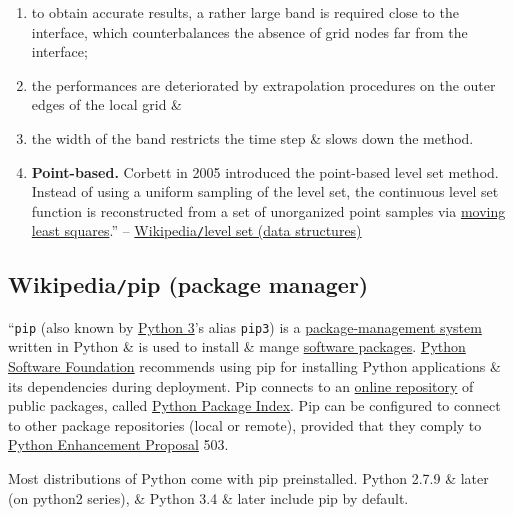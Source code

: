 \documentclass{article}
\begin{document}
\begin{enumerate}
\begin{enumerate}
		\item to obtain accurate results, a rather large band is required close to the interface, which counterbalances the absence of grid nodes far from the interface;
		\item the performances are deteriorated by extrapolation procedures on the outer edges of the local grid \&
		\item the width of the band restricts the time step \& slows down the method.
		\item {\bf Point-based.} {\sc Corbett} in 2005 introduced the point-based level set method. Instead of using a uniform sampling of the level set, the continuous level set function is reconstructed from a set of unorganized point samples via \href{https://en.wikipedia.org/wiki/Moving_least_squares}{moving least squares}.'' -- \href{https://en.wikipedia.org/wiki/Level_set_(data_structures)}{Wikipedia{\tt/}level set (data structures)}
	\end{enumerate}
\end{enumerate}


\subsection{Wikipedia{\tt/}pip (package manager)}
``{\tt pip} (also known by \href{https://en.wikipedia.org/wiki/Python_3}{Python 3}'s alias {\tt pip3}) is a \href{https://en.wikipedia.org/wiki/Package_manager}{package-management system} written in Python \& is used to install \& mange \href{https://en.wikipedia.org/wiki/Package_(package_management_system)}{software packages}. \href{https://en.wikipedia.org/wiki/Python_Software_Foundation}{Python Software Foundation} recommends using pip for installing Python applications \& its dependencies during deployment. Pip connects to an \href{https://en.wikipedia.org/wiki/Software_repository}{online repository} of public packages, called \href{https://en.wikipedia.org/wiki/Python_Package_Index}{Python Package Index}. Pip can be configured to connect to other package repositories (local or remote), provided that they comply to \href{https://en.wikipedia.org/wiki/Python_Enhancement_Proposal}{Python Enhancement Proposal} 503.

Most distributions of Python come with pip preinstalled. Python 2.7.9 \& later (on python2 series), \& Python 3.4 \& later include pip by default.
\end{document}
